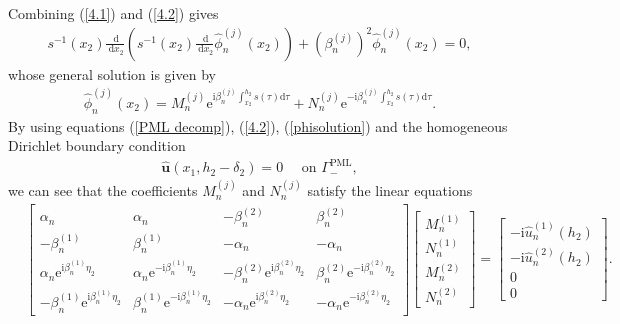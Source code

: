 \documentclass[final,3p,times]{elsarticle}
\begin{document}
Combining (\ref{4.1}) and (\ref{4.2}) gives 
\begin{align*}
	s^{-1}(x_2) \frac{\mathrm{~d}}{\mathrm{~d} x_2}\left(s^{-1}(x_2) \frac{\mathrm{~d}}{\mathrm{~d} x_2} \hat{\phi}_n^{(j)}(x_2)\right)+\left(\beta^{(j)}_{n}\right)^2 \hat{\phi}_n^{(j)}(x_2)=0,
\end{align*}
whose general solution is given by 
\begin{align}\label{phisolution}
	\hat{\phi}_n^{(j)}(x_2)=M_n^{(j)} \mathrm{e}^{\mathrm{i} \beta_n^{(j)} \int_{x_2}^{h_2} s(\tau) \mathrm{d} \tau}+N_n^{(j)} \mathrm{e}^{-\mathrm{i} \beta_n^{(j)} \int_{x_2}^{h_2} s(\tau) \mathrm{d} \tau} .
\end{align}
By using equations (\ref{PML decomp}), (\ref{4.2}), (\ref{phisolution}) and the homogeneous Dirichlet boundary condition
\begin{align*}
	\hat{\boldsymbol{u}}(x_1, h_2-\delta_2)=0 \quad \text { on } \Gamma_-^{\mathrm{PML}},
\end{align*}
we can see that the coefficients  $M_n^{(j)}$  and  $N_n^{(j)} $  satisfy the linear equations 
\begin{align*}
	&\left[\begin{array}{cccc}
		\alpha_n & \alpha_n & -\beta_n^{(2)} & \beta_n^{(2)} \\
		-\beta_n^{(1)} & \beta_n^{(1)} & -\alpha_n & -\alpha_n \\
		\alpha_n \mathrm{e}^{\mathrm{i} \beta_n^{(1)} \eta_2} & \alpha_n \mathrm{e}^{-\mathrm{i} \beta_n^{(1)} \eta_2} & -\beta_n^{(2)} \mathrm{e}^{\mathrm{i} \beta_n^{(2)} \eta_2} & \beta_n^{(2)} \mathrm{e}^{-\mathrm{i} \beta_n^{(2)} \eta_2}  \\
		-\beta_n^{(1)} \mathrm{e}^{\mathrm{i} \beta_n^{(1)} \eta_2} & \beta_n^{(1)} \mathrm{e}^{-\mathrm{i} \beta_n^{(1)} \eta_2} & -\alpha_n \mathrm{e}^{\mathrm{i} \beta_n^{(2)} \eta_2} & -\alpha_n \mathrm{e}^{-\mathrm{i} \beta_n^{(2)} \eta_2}
	\end{array}\right]\left[\begin{array}{c}
		M_n^{(1)} \\
		N_n^{(1)} \\
		M_n^{(2)} \\
		N_n^{(2)}
	\end{array}\right]=\left[\begin{array}{c}
		-\mathrm{i} \hat{u}_n^{(1)}(h_2) \\
		-\mathrm{i} \hat{u}_n^{(2)}(h_2) \\
		0 \\
		0
	\end{array}\right].
\end{align*}
\end{document}

